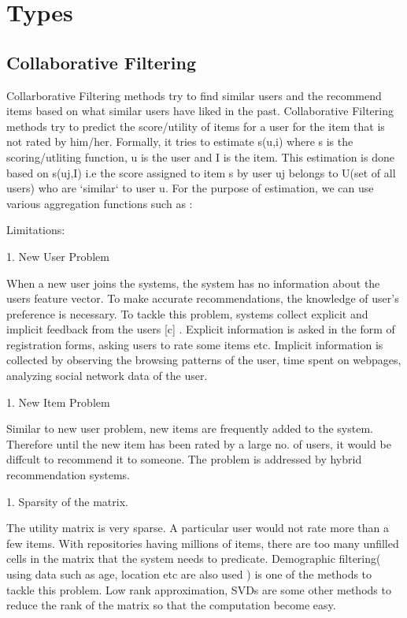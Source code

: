 \section{Types}
\subsection{Collaborative Filtering}
Collarborative Filtering methods try to find similar users and the recommend items based on what similar users have liked in the past. Collaborative Filtering methods try to predict the score/utility of items for a user for the item that is not rated by him/her. Formally, it tries to estimate s(u,i) where s is the scoring/utliting function, u is the user and I is the item. This estimation is done based on s(uj,I) i.e the score assigned to item s by user uj belongs to U(set of all users) who are `similar` to user u. For the purpose of estimation, we can use various aggregation functions such as : 

Limitations:

1. New User Problem

When a new user joins the systems, the system has no information about the users feature vector. To make accurate recommendations, the knowledge of user's preference is necessary. To tackle this problem, systems collect explicit and implicit feedback from the users [c] . Explicit information is asked in the form of registration forms, asking users to rate some items etc. Implicit information is collected by observing the browsing patterns of the user, time spent on webpages, analyzing social network data of the user.

1. New Item Problem

Similar to new user problem, new items are frequently added to the system. Therefore until the new item has been rated by a large no. of users, it would be diffcult to recommend it to someone. The problem is addressed by hybrid recommendation systems.

1. Sparsity of the matrix.

The utility matrix is very sparse. A particular user would not rate more than a few items. With repositories having millions of items, there are too many unfilled cells in the matrix that the system needs to predicate. Demographic filtering( using data such as age, location etc are also used ) is one of the methods to tackle this problem. Low rank approximation, SVDs are some other methods to reduce the rank of the matrix so that the computation become easy. 

